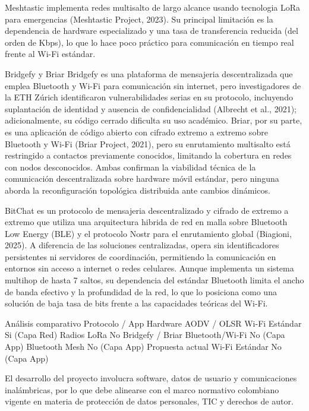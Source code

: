 Meshtastic implementa redes multisalto de largo alcance usando tecnologia LoRa para emergencias (Meshtastic Project, 2023). Su principal limitación es la dependencia de hardware especializado y una tasa de transferencia reducida (del orden de Kbps), lo que lo hace poco práctico para comunicación en tiempo real frente al Wi-Fi estándar.

Bridgefy y Briar Bridgefy es una plataforma de mensajeria descentralizada que emplea Bluetooth y Wi-Fi para comunicación sin internet, pero investigadores de la ETH Zúrich identificaron vulnerabilidades serias en su protocolo, incluyendo suplantación de identidad y ausencia de confidencialidad (Albrecht et al., 2021); adicionalmente, su código cerrado dificulta su uso académico. Briar, por su parte, es una aplicación de código abierto con cifrado extremo a extremo sobre Bluetooth y Wi-Fi (Briar Project, 2021), pero su enrutamiento multisalto está restringido a contactos previamente conocidos, limitando la cobertura en redes con nodos desconocidos. Ambas confirman la viabilidad técnica de la comunicación descentralizada sobre hardware móvil estándar, pero ninguna aborda la reconfiguración topológica distribuida ante cambios dinámicos.

BitChat es un protocolo de mensajeria descentralizado y cifrado de extremo a extremo que utiliza una arquitectura hibrida de red en malla sobre Bluetooth Low Energy (BLE) y el protocolo Nostr para el enrutamiento global (Biagioni, 2025). A diferencia de las soluciones centralizadas, opera sin identificadores persistentes ni servidores de coordinación, permitiendo la comunicación en entornos sin acceso a internet o redes celulares. Aunque implementa un sistema multihop de hasta 7 saltos, su dependencia del estándar Bluetooth limita el ancho de banda efectivo y la profundidad de la red, lo que lo posiciona como una solución de baja tasa de bits frente a las capacidades teóricas del Wi-Fi.

Análisis comparativo Protocolo / App Hardware AODV / OLSR Wi-Fi Estándar Si (Capa Red) Radios LoRa No Bridgefy / Briar Bluetooth/Wi-Fi No (Capa App) Bluetooth Mesh No (Capa App) Propuesta actual Wi-Fi Estándar No (Capa App)


El desarrollo del proyecto involucra software, datos de usuario y comunicaciones inalámbricas, por lo que debe alinearse con el marco normativo colombiano vigente en materia de protección de datos personales, TIC y derechos de autor.


